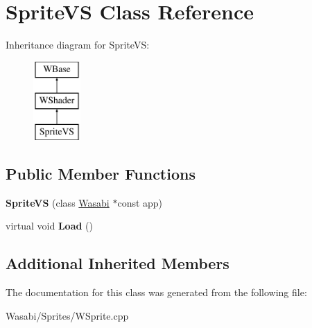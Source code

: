 \hypertarget{class_sprite_v_s}{}\section{Sprite\+VS Class Reference}
\label{class_sprite_v_s}
Inheritance diagram for Sprite\+VS\+:\begin{figure}[H]
\begin{center}
\leavevmode
\includegraphics[height=3.000000cm]{class_sprite_v_s}
\end{center}
\end{figure}
\subsection*{Public Member Functions}
\begin{DoxyCompactItemize}
\item 
{\bfseries Sprite\+VS} (class \hyperlink{class_wasabi}{Wasabi} $\ast$const app)\hypertarget{class_sprite_v_s_a3511fa72cef1eccc82028d14135a08cf}{}\label{class_sprite_v_s_a3511fa72cef1eccc82028d14135a08cf}

\item 
virtual void {\bfseries Load} ()\hypertarget{class_sprite_v_s_abd9362ef4fca5c252de18fcb089f7c40}{}\label{class_sprite_v_s_abd9362ef4fca5c252de18fcb089f7c40}

\end{DoxyCompactItemize}
\subsection*{Additional Inherited Members}


The documentation for this class was generated from the following file\+:\begin{DoxyCompactItemize}
\item 
Wasabi/\+Sprites/W\+Sprite.\+cpp\end{DoxyCompactItemize}
